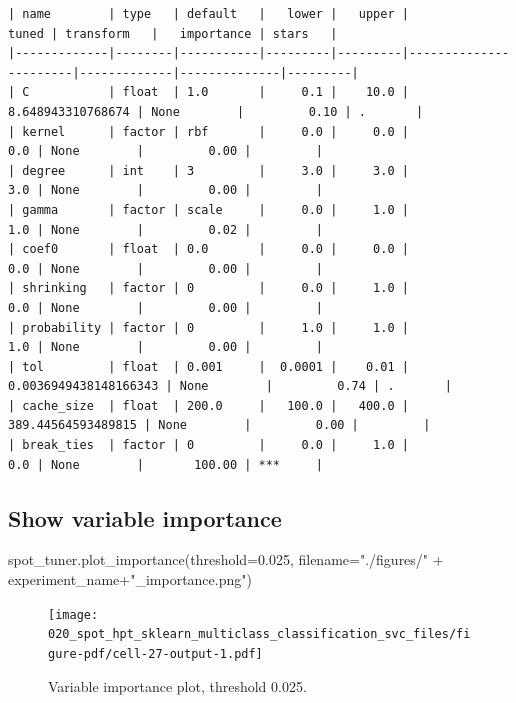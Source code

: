 \documentclass[
  letterpaper,
  DIV=11,
  numbers=noendperiod]{scrreprt}
\newenvironment{Shaded}{\begin{snugshade}}{\end{snugshade}}
\newcommand{\FloatTok}[1]{\textcolor[rgb]{0.68,0.00,0.00}{#1}}
\newcommand{\NormalTok}[1]{\textcolor[rgb]{0.00,0.23,0.31}{#1}}
\newcommand{\OperatorTok}[1]{\textcolor[rgb]{0.37,0.37,0.37}{#1}}
\newcommand{\StringTok}[1]{\textcolor[rgb]{0.13,0.47,0.30}{#1}}
\begin{document}
\begin{verbatim}
| name        | type   | default   |   lower |   upper |                 tuned | transform   |   importance | stars   |
|-------------|--------|-----------|---------|---------|-----------------------|-------------|--------------|---------|
| C           | float  | 1.0       |     0.1 |    10.0 |     8.648943310768674 | None        |         0.10 | .       |
| kernel      | factor | rbf       |     0.0 |     0.0 |                   0.0 | None        |         0.00 |         |
| degree      | int    | 3         |     3.0 |     3.0 |                   3.0 | None        |         0.00 |         |
| gamma       | factor | scale     |     0.0 |     1.0 |                   1.0 | None        |         0.02 |         |
| coef0       | float  | 0.0       |     0.0 |     0.0 |                   0.0 | None        |         0.00 |         |
| shrinking   | factor | 0         |     0.0 |     1.0 |                   0.0 | None        |         0.00 |         |
| probability | factor | 0         |     1.0 |     1.0 |                   1.0 | None        |         0.00 |         |
| tol         | float  | 0.001     |  0.0001 |    0.01 | 0.0036949438148166343 | None        |         0.74 | .       |
| cache_size  | float  | 200.0     |   100.0 |   400.0 |    389.44564593489815 | None        |         0.00 |         |
| break_ties  | factor | 0         |     0.0 |     1.0 |                   0.0 | None        |       100.00 | ***     |
\end{verbatim}

\hypertarget{show-variable-importance-3}{%
\subsection{Show variable importance}\label{show-variable-importance-3}}

\begin{Shaded}
\begin{Highlighting}[]
\NormalTok{spot\_tuner.plot\_importance(threshold}\OperatorTok{=}\FloatTok{0.025}\NormalTok{, filename}\OperatorTok{=}\StringTok{"./figures/"} \OperatorTok{+}\NormalTok{ experiment\_name}\OperatorTok{+}\StringTok{"\_importance.png"}\NormalTok{)}
\end{Highlighting}
\end{Shaded}

\begin{figure}[H]

{\centering \texttt{[image: 020\_spot\_hpt\_sklearn\_multiclass\_classification\_svc\_files/figure-pdf/cell-27-output-1.pdf]}

}

\caption{Variable importance plot, threshold 0.025.}

\end{figure}
\end{document}
